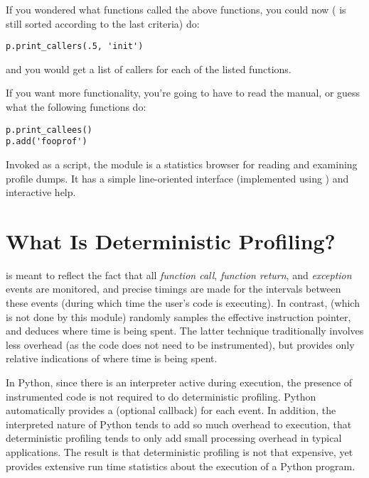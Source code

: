 If you wondered what functions called the above functions, you could
now ( is still sorted according to the last criteria) do:

\begin{verbatim}
p.print_callers(.5, 'init')
\end{verbatim}

and you would get a list of callers for each of the listed functions.

If you want more functionality, you're going to have to read the
manual, or guess what the following functions do:

\begin{verbatim}
p.print_callees()
p.add('fooprof')
\end{verbatim}

Invoked as a script, the  module is a statistics
browser for reading and examining profile dumps.  It has a simple
line-oriented interface (implemented using ) and
interactive help.

\section{What Is Deterministic Profiling?}

 is meant to reflect the fact that all
\emph{function call}, \emph{function return}, and \emph{exception} events
are monitored, and precise timings are made for the intervals between
these events (during which time the user's code is executing).  In
contrast,  (which is not done by this
module) randomly samples the effective instruction pointer, and
deduces where time is being spent.  The latter technique traditionally
involves less overhead (as the code does not need to be instrumented),
but provides only relative indications of where time is being spent.

In Python, since there is an interpreter active during execution, the
presence of instrumented code is not required to do deterministic
profiling.  Python automatically provides a  (optional
callback) for each event.  In addition, the interpreted nature of
Python tends to add so much overhead to execution, that deterministic
profiling tends to only add small processing overhead in typical
applications.  The result is that deterministic profiling is not that
expensive, yet provides extensive run time statistics about the
execution of a Python program.


